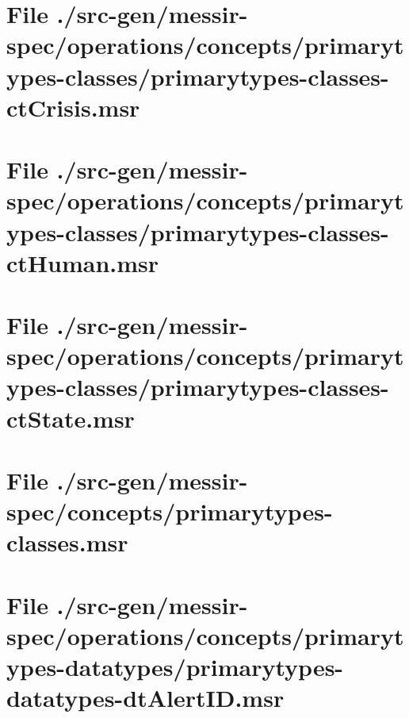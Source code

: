 \section[File /src-gen/messir-spec/operations.../primarytypes-classes-ctCrisis.msr]{File ./src-gen/messir-spec/operations/concepts/primarytypes-classes/primarytypes-classes-ctCrisis.msr}
\scriptsize

\normalsize
	
\section[File /src-gen/messir-spec/operations.../primarytypes-classes-ctHuman.msr]{File ./src-gen/messir-spec/operations/concepts/primarytypes-classes/primarytypes-classes-ctHuman.msr}
\scriptsize

\normalsize
	
\section[File /src-gen/messir-spec/operations.../primarytypes-classes-ctState.msr]{File ./src-gen/messir-spec/operations/concepts/primarytypes-classes/primarytypes-classes-ctState.msr}
\scriptsize

\normalsize
	
\section[File /src-gen/messir-spec/concepts/primarytypes-classes.msr]{File ./src-gen/messir-spec/concepts/primarytypes-classes.msr}
\scriptsize

\normalsize
	
\section[File /src-gen/messir-spec/operations.../primarytypes-datatypes-dtAlertID.msr]{File ./src-gen/messir-spec/operations/concepts/primarytypes-datatypes/primarytypes-datatypes-dtAlertID.msr}
\scriptsize

\normalsize
	
